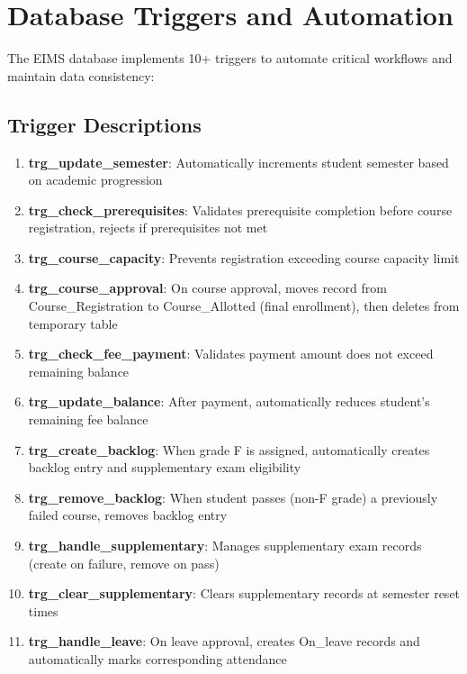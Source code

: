 \documentclass[12pt]{article}
\begin{document}
\newpage

\section{Database Triggers and Automation}

The EIMS database implements 10+ triggers to automate critical workflows and maintain data consistency:

\subsection{Trigger Descriptions}

\begin{enumerate}
    \item \textbf{trg\_update\_semester}: Automatically increments student semester based on academic progression
    
    \item \textbf{trg\_check\_prerequisites}: Validates prerequisite completion before course registration, rejects if prerequisites not met
    
    \item \textbf{trg\_course\_capacity}: Prevents registration exceeding course capacity limit
    
    \item \textbf{trg\_course\_approval}: On course approval, moves record from Course\_Registration to Course\_Allotted (final enrollment), then deletes from temporary table
    
    \item \textbf{trg\_check\_fee\_payment}: Validates payment amount does not exceed remaining balance
    
    \item \textbf{trg\_update\_balance}: After payment, automatically reduces student's remaining fee balance
    
    \item \textbf{trg\_create\_backlog}: When grade F is assigned, automatically creates backlog entry and supplementary exam eligibility
    
    \item \textbf{trg\_remove\_backlog}: When student passes (non-F grade) a previously failed course, removes backlog entry
    
    \item \textbf{trg\_handle\_supplementary}: Manages supplementary exam records (create on failure, remove on pass)
    
    \item \textbf{trg\_clear\_supplementary}: Clears supplementary records at semester reset times
    
    \item \textbf{trg\_handle\_leave}: On leave approval, creates On\_leave records and automatically marks corresponding attendance
\end{enumerate}
\end{document}
